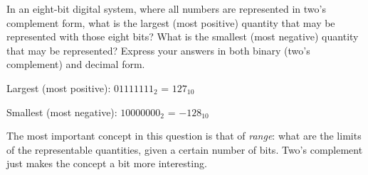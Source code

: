 

In an eight-bit digital system, where all numbers are represented in two's complement form, what is the largest (most positive) quantity that may be represented with those eight bits?  What is the smallest (most negative) quantity that may be represented?  Express your answers in both binary (two's complement) and decimal form.







Largest (most positive): $01111111_2$ = $127_{10}$

\vskip 10pt

Smallest (most negative): $10000000_2$ = $-128_{10}$







The most important concept in this question is that of {\it range}: what are the limits of the representable quantities, given a certain number of bits.  Two's complement just makes the concept a bit more interesting.




